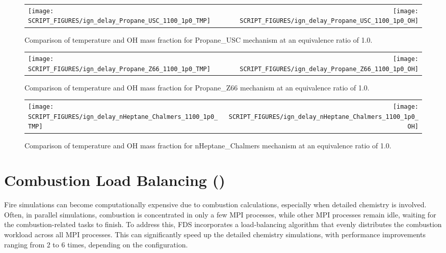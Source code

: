 \documentclass[11pt]{book}
\begin{document}
\begin{figure}[p]
\begin{tabular*}{\textwidth}{lr}
\texttt{[image: SCRIPT\_FIGURES/ign\_delay\_Propane\_USC\_1100\_1p0\_TMP]} &
\texttt{[image: SCRIPT\_FIGURES/ign\_delay\_Propane\_USC\_1100\_1p0\_OH]}
\end{tabular*}
\caption[Results of the {\ct ignition\_delay} test cases]{Comparison of temperature and OH mass fraction for Propane\_USC mechanism at an equivalence ratio of 1.0.}
\label{fig:ign_delay_Propane_USC_phi_1.0}
\end{figure}

\begin{figure}[p]
\begin{tabular*}{\textwidth}{lr}
\texttt{[image: SCRIPT\_FIGURES/ign\_delay\_Propane\_Z66\_1100\_1p0\_TMP]} &
\texttt{[image: SCRIPT\_FIGURES/ign\_delay\_Propane\_Z66\_1100\_1p0\_OH]}
\end{tabular*}
\caption[Results of the {\ct ignition\_delay} test cases]{Comparison of temperature and OH mass fraction for Propane\_Z66 mechanism at an equivalence ratio of 1.0.}
\label{fig:ign_delay_Propane_Z66_phi_1.0}
\end{figure}

\begin{figure}[p]
\begin{tabular*}{\textwidth}{lr}
\texttt{[image: SCRIPT\_FIGURES/ign\_delay\_nHeptane\_Chalmers\_1100\_1p0\_TMP]} &
\texttt{[image: SCRIPT\_FIGURES/ign\_delay\_nHeptane\_Chalmers\_1100\_1p0\_OH]}
\end{tabular*}
\caption[Results of the {\ct ignition\_delay} test cases]{Comparison of temperature and OH mass fraction for nHeptane\_Chalmers mechanism at an equivalence ratio of 1.0.}
\label{fig:ign_delay_nHeptane_Chalmers_phi_1.0}
\end{figure}


\section{Combustion Load Balancing ()}
\label{comb_load_bal}

Fire simulations can become computationally expensive due to combustion calculations, especially when detailed chemistry is involved. Often, in parallel simulations, combustion is concentrated in only a few MPI processes, while other MPI processes remain idle, waiting for the combustion-related tasks to finish. To address this, FDS incorporates a load-balancing algorithm that evenly distributes the combustion workload across all MPI processes. This can significantly speed up the detailed chemistry simulations, with performance improvements ranging from 2 to 6 times, depending on the configuration.
\end{document}
